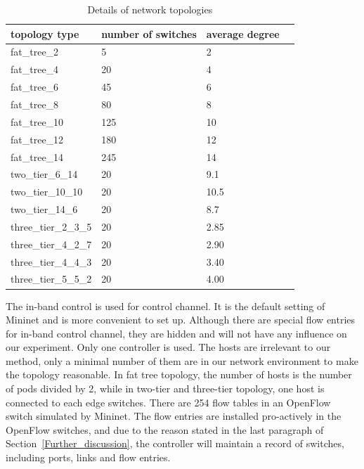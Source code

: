 \begin{table}[H]
\centering
\caption{Details of network topologies}
\begin{tabular}{|l|l|l|l|}
\hline topology type & number of switches & average degree \\
\hline
\hline fat\_tree\_2 & 5 & 2 \\
\hline fat\_tree\_4 & 20 & 4 \\
\hline fat\_tree\_6 & 45 & 6 \\
\hline fat\_tree\_8 & 80 & 8 \\
\hline fat\_tree\_10 & 125 & 10 \\
\hline fat\_tree\_12 & 180 & 12 \\
\hline fat\_tree\_14 & 245 & 14 \\
\hline two\_tier\_6\_14 & 20 & 9.1 \\
\hline two\_tier\_10\_10 & 20 & 10.5 \\
\hline two\_tier\_14\_6 & 20 & 8.7 \\
\hline three\_tier\_2\_3\_5 & 20 & 2.85 \\
\hline three\_tier\_4\_2\_7 & 20 & 2.90 \\
\hline three\_tier\_4\_4\_3 & 20 & 3.40 \\
\hline three\_tier\_5\_5\_2 & 20 & 4.00 \\
\hline 
\end{tabular}
\label{table:network_env}
\end{table}

The in-band control is used for control channel. It is the default setting of Mininet and is more convenient to set up. Although there are special flow entries for in-band control channel, they are hidden and will not have any influence on our experiment. Only one controller is used. The hosts are irrelevant to our method, only a minimal number of them are in our network environment to make the topology reasonable. In fat tree topology, the number of hosts is the number of pods divided by 2, while in two-tier and three-tier topology, one host is connected to each edge switches. There are 254 flow tables in an OpenFlow switch simulated by Mininet. The flow entries are installed pro-actively in the OpenFlow switches, and due to the reason stated in the last paragraph of Section~\ref{Further_discussion}, the controller will maintain a record of switches, including ports, links and flow entries. 

